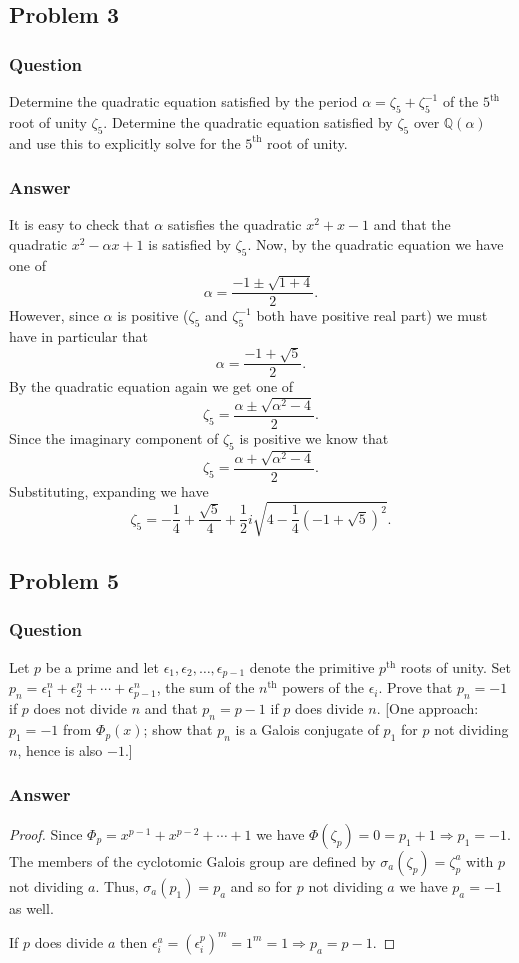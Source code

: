 \documentclass[10pt]{article}
\begin{document}
\subsection{Problem 3}
\subsubsection{Question}
Determine the quadratic equation satisfied by the period $\alpha = \zeta_5+\zeta_5^{-1}$ of the $5^{\mathrm{th}}$ root of unity $\zeta_5$. Determine the quadratic equation satisfied by $\zeta_5$ over $\mathbb{Q}(\alpha)$ and use this to explicitly solve for the $5^\mathrm{th}$ root of unity.
\subsubsection{Answer}
It is easy to check that $\alpha$ satisfies the quadratic $x^2+x-1$ and that the quadratic $x^2-\alpha x +1$ is satisfied by $\zeta_5$. Now, by the quadratic equation we have one of
\[\alpha = \frac{-1 \pm \sqrt{1+4}}{2} .\]
However, since $\alpha$ is positive ($\zeta_5$ and $\zeta_5^{-1}$ both have positive real part) we must have in particular that
\[\alpha = \frac{-1 + \sqrt{5}}{2} .\]
By the quadratic equation again we get one of
\[ \zeta_5 = \frac{\alpha \pm \sqrt{\alpha^2 - 4}}{2} .\]
Since the imaginary component of $\zeta_5$ is positive we know that 
\[ \zeta_5 = \frac{\alpha + \sqrt{\alpha^2 - 4}}{2} .\]
Substituting, expanding we have
\[\zeta_5 =-\frac{1}{4}+\frac{\sqrt{5}}{4}+\frac{1}{2} i \sqrt{4-\frac{1}{4} \left(-1+\sqrt{5}\right)^2}.\]


\subsection{Problem 5}
\subsubsection{Question}
Let $p$ be a prime and let $\epsilon_1,\epsilon_2,\dots,\epsilon_{p-1}$ denote the primitive $p^\mathrm{th}$ roots of unity. Set $p_n=\epsilon_1^n+\epsilon_2^n+\cdots+\epsilon_{p-1}^n$, the sum of the $n^\mathrm{th}$ powers of the $\epsilon_i$. Prove that $p_n=-1$ if $p$ does not divide $n$ and that $p_n=p-1$ if $p$ does divide $n$. [One approach: $p_1=-1$ from $\Phi_p(x)$; show that $p_n$ is a Galois conjugate of $p_1$ for $p$ not dividing $n$, hence is also $-1$.]
\subsubsection{Answer}
\begin{proof}
Since $\Phi_p = x^{p-1}+ x^{p-2} + \cdots +1$ we have $\Phi(\zeta_p) =0= p_1+1 \Rightarrow p_1=-1$. The members of the cyclotomic Galois group are defined by $\sigma_a(\zeta_p)= \zeta_p^a$ with $p$ not dividing $a$. Thus, $\sigma_a(p_1) = p_a$ and so for $p$ not dividing $a$ we have $p_a=-1$ as well.

If $p$ does divide $a$ then $\epsilon_i^a = (\epsilon_i^p)^m=1^m=1 \Rightarrow p_a = p-1$.
\end{proof}
\end{document}
